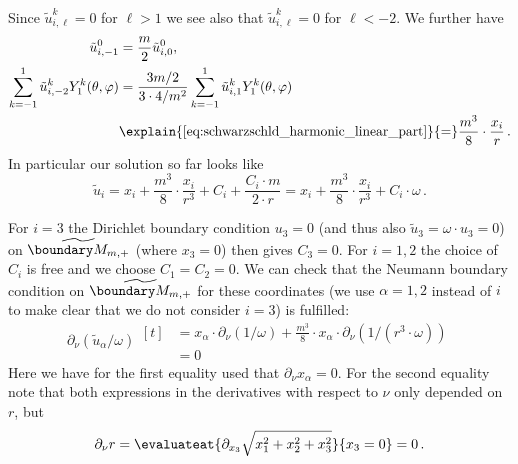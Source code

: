 \documentclass[titlepage,numbers=noenddot,oneside,%
cleardoublepage=empty,paper=a4,fontsize=11pt,%
english,%
]{scrartcl}
\newcommand*{\mathfullstop}{\,.}
\begin{document}
\begin{description}
\begin{align*}
    \end{align*}
    Since \( \tilde{u}^k_{i,\ell}=0 \) for \( \ell>1 \) we see also that \( \tilde{u}^k_{i,\ell}=0 \) for \( \ell< -2 \). We further have
    \begin{align*}
        \tilde{u}^0_{i,-1}&=\frac{m}{2}\tilde{u}_{i,0}^0,\\
        \sum_{k=-1}^{1}\tilde{u}^k_{i,-2}Y^k_1(\theta,\varphi)&\begin{aligned}[t]
            &=\frac{3m/2}{3\cdot 4/m^2}\sum_{k=-1}^{1}\tilde{u}^k_{i,1}Y^k_1(\theta,\varphi)\\
            &\explain{\cref{eq:schwarzschld_harmonic_linear_part}}{=}\frac{m^3}{8}\cdot \frac{x_i}{r}\mathfullstop
        \end{aligned}
    \end{align*}
    In particular our solution so far looks like
    \begin{equation*}
        \tilde{u}_i=x_i+\frac{m^3}{8}\cdot \frac{x_i}{r^3}+C_i+\frac{C_i\cdot m}{2\cdot r}=x_i+\frac{m^3}{8}\cdot \frac{x_i}{r^3}+C_i\cdot \omega\mathfullstop
    \end{equation*}
    
    For \( i=3 \) the Dirichlet boundary condition \( u_3=0 \) (and thus also \( \tilde{u}_3=\omega\cdot u_3=0 \)) on \( \schwarzschildboundary \) (where \( x_3=0 \)) then gives \( C_3=0 \). For \( i=1,2 \) the choice of \( C_i \) is free and we choose \( C_1=C_2=0 \). We can check that the Neumann boundary condition on \( \schwarzschildboundary \) for these coordinates (we use \( \alpha=1,2 \) instead of \( i \) to make clear that we do not consider \( i=3 \)) is fulfilled:
    \begin{equation*}
        \partial_\nu (\tilde{u}_{\alpha}/\omega)\begin{aligned}[t]
            &=x_\alpha\cdot \partial_\nu (1/\omega)+\frac{m^3}{8}\cdot x_\alpha \cdot \partial_\nu(1/(r^3\cdot \omega))\\
            &=0
        \end{aligned}
    \end{equation*}
    Here we have for the first equality used that \( \partial_\nu x_\alpha=0 \). For the second equality note that both expressions in the derivatives with respect to \( \nu \) only depended on \( r \), but 
    \begin{equation*}
        \partial_\nu r=\evaluateat{\partial_{x_3} \sqrt{x_1^2+x_2^2+x_3^2}}{x_3=0}=0\mathfullstop
    \end{equation*}


\end{description}
\end{document}
